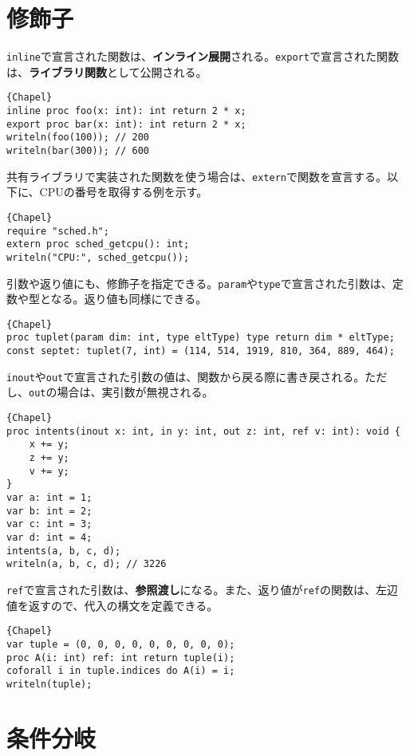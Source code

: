 \documentclass[10pt,a4paper]{book}
\begin{document}
\section{修飾子}

\texttt{inline}で宣言された関数は、\textbf{インライン展開}される。\texttt{export}で宣言された関数は、\textbf{ライブラリ関数}として公開される。

\begin{Verbatim}{Chapel}
inline proc foo(x: int): int return 2 * x;
export proc bar(x: int): int return 2 * x;
writeln(foo(100)); // 200
writeln(bar(300)); // 600
\end{Verbatim}

共有ライブラリで実装された関数を使う場合は、\texttt{extern}で関数を宣言する。以下に、CPUの番号を取得する例を示す。

\begin{Verbatim}{Chapel}
require "sched.h";
extern proc sched_getcpu(): int;
writeln("CPU:", sched_getcpu());
\end{Verbatim}

引数や返り値にも、修飾子を指定できる。\texttt{param}や\texttt{type}で宣言された引数は、定数や型となる。返り値も同様にできる。

\begin{Verbatim}{Chapel}
proc tuplet(param dim: int, type eltType) type return dim * eltType;
const septet: tuplet(7, int) = (114, 514, 1919, 810, 364, 889, 464);
\end{Verbatim}

\texttt{inout}や\texttt{out}で宣言された引数の値は、関数から戻る際に書き戻される。ただし、\texttt{out}の場合は、実引数が無視される。

\begin{Verbatim}{Chapel}
proc intents(inout x: int, in y: int, out z: int, ref v: int): void {
	x += y;
	z += y;
	v += y;
}
var a: int = 1;
var b: int = 2;
var c: int = 3;
var d: int = 4;
intents(a, b, c, d);
writeln(a, b, c, d); // 3226
\end{Verbatim}

\texttt{ref}で宣言された引数は、\textbf{参照渡し}になる。また、返り値が\texttt{ref}の関数は、左辺値を返すので、代入の構文を定義できる。

\begin{Verbatim}{Chapel}
var tuple = (0, 0, 0, 0, 0, 0, 0, 0, 0);
proc A(i: int) ref: int return tuple(i);
coforall i in tuple.indices do A(i) = i;
writeln(tuple);
\end{Verbatim}

\section{条件分岐}
\end{document}
